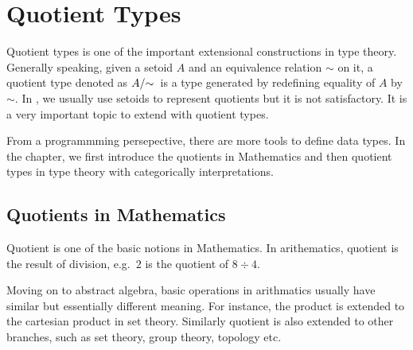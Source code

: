 \chapter{Quotient Types}
\label{qt}

Quotient types is one of the important extensional constructions in
type theory. Generally speaking, given a setoid $A$ and an
equivalence relation $\sim$ on it, a quotient type denoted as
$\qset{A}$ is a type generated by redefining equality of $A$ by
$\sim$. In \itt, we usually use setoids to represent quotients but it
is not satisfactory. It is a very important topic to extend \itt with
quotient types.

From a programmming persepective, there are more tools to define data
types. 
In the chapter, we first introduce the quotients in Mathematics and
then quotient types in type theory with categorically interpretations.


\section{Quotients in Mathematics}


Quotient is one of the basic notions in Mathematics. In arithematics, quotient
is the result of division, e.g.\ $2$ is the quotient of $8 \div 4$.

Moving on to abstract algebra, basic operations in arithmatics usually
have similar but essentially different meaning. For instance, the
product is extended to the cartesian product in set theory. 
Similarly quotient is also extended to other branches, such as set
theory, group theory, topology etc.

